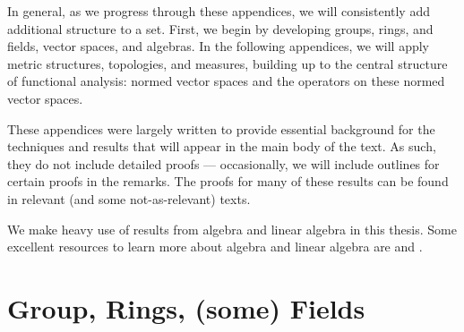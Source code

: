 In general, as we progress through these appendices, we will consistently add additional structure to a set. First, we begin by developing groups, rings, and fields, vector spaces, and algebras. In the following appendices, we will apply metric structures, topologies, and measures, building up to the central structure of functional analysis: normed vector spaces and the operators on these normed vector spaces.\newline

These appendices were largely written to provide essential background for the techniques and results that will appear in the main body of the text. As such, they do not include detailed proofs --- occasionally, we will include outlines for certain proofs in the remarks. The proofs for many of these results can be found in relevant (and some not-as-relevant) texts.\newline

We make heavy use of results from algebra and linear algebra in this thesis. Some excellent resources to learn more about algebra and linear algebra are \cite{dummit_and_foote} and \cite{algebra_chapter_0}.
\section{Group, Rings, (some) Fields}%
